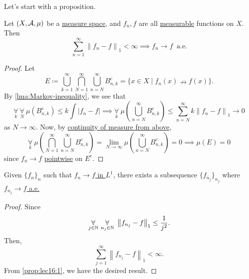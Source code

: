 Let's start with a proposition.

\begin{proposition}\label{prop:lec16:1}
	Let \((X, \mathcal{\MakeUppercase{a}} , \mu )\) be a \hyperref[def:measure-space]{measure space}, and \(f_{n}, f\) are all \hyperref[def:measurable-function]{measurable}
	functions on \(X\). Then
	\[
		\sum\limits_{n=1}^{\infty} \left\lVert f_{n} - f\right\rVert_1 < \infty \implies \hyperref[def:converge-almost-everywhere]{f_{n}\to f\ \text{ a.e.}}
	\]
\end{proposition}
\begin{proof}
	Let
	\[
		E \coloneqq \bigcup\limits_{k=1}^{\infty} \bigcap\limits_{N=1}^{\infty} \bigcup\limits_{n=N}^{\infty} B_{n, k}^{c} = \{x\in X \mid f_{n}(x)\nrightarrow f(x)\}.
	\]
	By \autoref{lma:Markov-inequality}, we see that
	\[
		\underset{k}{\forall }\ \underset{N}{\forall }\ \mu \left(B_{n, k}^{c} \right) \leq k \int \left\vert f_{n} - f \right\vert \implies \underset{k}{\forall }\ \mu \left(\bigcup\limits_{n=N}^{\infty} B_{n, k}^{c} \right)\leq \sum\limits_{n=N}^{\infty} k\left\lVert f_{n} - f\right\rVert_1 \to 0
	\]
	as \(N\to \infty \). Now, by \hyperref[thm:measure-space-continuity-from-above]{continuity of measure from above},
	\[
		\underset{k}{\forall }\ \mu \left(\bigcap\limits_{N=1}^{\infty} \bigcup\limits_{n=N}^{\infty} B_{n, k}^{c} \right)= \lim\limits_{N \to \infty} \mu \left(\bigcup\limits_{n=N}^{\infty} B_{n, k}^{c} \right) = 0 \implies \mu (E) = 0
	\]
	since \(f_{n}\to f\) \hyperref[def:pointwise-convergence]{pointwise} on \(E^{c} \).
\end{proof}

\begin{corollary}
	Given \(\{f_{n}\}_n\) such that \hyperref[def:converge-in-L-1]{\(f_{n}\to f\) in \(L^1\)}, there exists a subsequence \(\{f_{n_{j}}\}_{n_{j}}\) where
	\hyperref[def:converge-almost-everywhere]{\(f_{n_{j}}\to f\) a.e.}
\end{corollary}
\begin{proof}
	Since
	\[
		\underset{j\in \mathbb{\MakeUppercase{n}} }{\forall }\ \underset{n_{j}\in \mathbb{\MakeUppercase{n}} }{\forall }\ \left\lVert f_{n_{j}} - f\right\rVert _1 \leq \frac{1}{j^{2} }.
	\]
	Then,
	\[
		\sum\limits_{j=1}^{\infty} \left\lVert f_{n_{j}} - f\right\rVert _1 < \infty.
	\]
	From \autoref{prop:lec16:1}, we have the desired result.
\end{proof}

